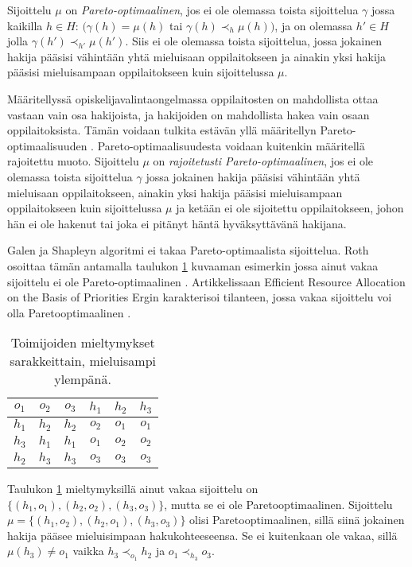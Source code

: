 \documentclass[twoside]{tktltiki}
\begin{document}
Sijoittelu $\mu$ on \emph{Pareto-optimaalinen}, jos ei ole olemassa
toista sijoittelua $\gamma$ jossa kaikilla $h \in H$: $(\gamma(h) =
\mu(h)$ tai $\gamma(h) \prec_h \mu(h))$, ja on olemassa $h' \in H$
jolla $\gamma(h') \prec_{h'} \mu(h')$. Siis ei ole olemassa toista
sijoittelua, jossa jokainen hakija pääsisi vähintään yhtä mieluisaan
oppilaitokseen ja ainakin yksi hakija pääsisi mieluisampaan
oppilaitokseen kuin sijoittelussa $\mu$.

Määritellyssä opiskelijavalintaongelmassa oppilaitosten on mahdollista
ottaa vastaan vain osa hakijoista, ja hakijoiden on mahdollista hakea
vain osaan oppilaitoksista. Tämän voidaan tulkita estävän yllä
määritellyn Pareto-optimaalisuuden \cite{kojima10}.
Pareto-optimaalisuudesta voidaan kuitenkin määritellä rajoitettu
muoto. Sijoittelu $\mu$ on \emph{rajoitetusti Pareto-optimaalinen},
jos ei ole olemassa toista sijoittelua $\gamma$ jossa jokainen hakija
pääsisi vähintään yhtä mieluisaan oppilaitokseen, ainakin yksi hakija
pääsisi mieluisampaan oppilaitokseen kuin sijoittelussa $\mu$ ja
ketään ei ole sijoitettu oppilaitokseen, johon hän ei ole hakenut tai
joka ei pitänyt häntä hyväksyttävänä hakijana.

Galen ja Shapleyn algoritmi ei takaa Pareto-optimaalista sijoittelua.
Roth osoittaa tämän antamalla taulukon \ref{roth_optimaalisuus}
kuvaaman esimerkin jossa ainut vakaa sijoittelu ei ole
Pareto-optimaalinen \cite{roth82}. Artikkelissaan Efficient Resource
Allocation on the Basis of Priorities Ergin karakterisoi tilanteen,
jossa vakaa sijoittelu voi olla Pareto\hyph optimaalinen
\cite{ergin02}.

\begin{table}[b]
  \begin{center}
    \begin{tabular}{ c c c | c c c }
      $o_1$ & $o_2$ & $o_3$ & $h_1$ & $h_2$ & $h_3$ \\
      \hline
      $h_1$ & $h_2$ & $h_2$ & $o_2$ & $o_1$ & $o_1$ \\
      $h_3$ & $h_1$ & $h_1$ & $o_1$ & $o_2$ & $o_2$ \\
      $h_2$ & $h_3$ & $h_3$ & $o_3$ & $o_3$ & $o_3$
    \end{tabular}
    \caption{Toimijoiden mieltymykset sarakkeittain, mieluisampi ylempänä.}
    \label{roth_optimaalisuus}
  \end{center}
\end{table}

Taulukon \ref{roth_optimaalisuus} mieltymyksillä ainut vakaa
sijoittelu on $\{(h_1, o_1), (h_2, o_2), (h_3, o_3)\}$, mutta se ei
ole Pareto\hyph optimaalinen. Sijoittelu $\mu = \{(h_1, o_2), (h_2,
o_1), (h_3, o_3)\}$ olisi Pareto\hyph optimaalinen, sillä siinä
jokainen hakija pääsee mieluisimpaan hakukohteeseensa. Se ei
kuitenkaan ole vakaa, sillä $\mu(h_3) \neq o_1$ vaikka $h_3
\prec_{o_1} h_2$ ja $o_1 \prec_{h_3} o_3$.
\end{document}
